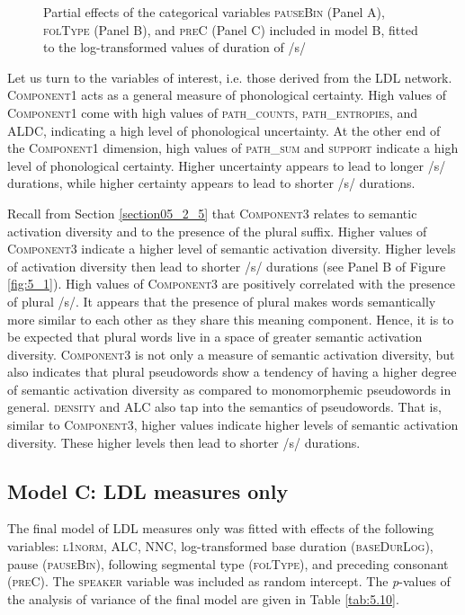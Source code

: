 \begin{figure}
    \centering
    
    \caption{Partial effects of the categorical variables \textsc{pauseBin} (Panel A), \textsc{folType} (Panel B), and \textsc{preC} (Panel C) included in model B, fitted to the log-transformed values of duration of /s/}
    \label{fig:5_2}
\end{figure}

Let us turn to the variables of interest, i.e. those derived from the LDL network. \textsc{Component1} acts as a general measure of phonological certainty. High values of \textsc{Component1} come with high values of \textsc{path\_counts}, \textsc{path\_entropies}, and \textsc{ALDC}, indicating a high level of phonological uncertainty. At the other end of the \textsc{Component1} dimension, high values of \textsc{path\_sum} and \textsc{support} indicate a high level of phonological certainty. Higher uncertainty appears to lead to longer /s/ durations, while higher certainty appears to lead to shorter /s/ durations.

Recall from Section \ref{section05_2_5} that \textsc{Component3} relates to semantic activation diversity and to the presence of the plural suffix. Higher values of \textsc{Component3} indicate a higher level of semantic activation diversity. Higher levels of activation diversity then lead to shorter /s/ durations (see Panel B of Figure \ref{fig:5_1}). High values of \textsc{Component3} are positively correlated with the presence of plural /s/. It appears that the presence of plural makes words semantically more similar to each other as they share this meaning component. Hence, it is to be expected that plural words live in a space of greater semantic activation diversity. \textsc{Component3} is not only a measure of semantic activation diversity, but also indicates that plural pseudowords show a tendency of having a higher degree of semantic activation diversity as compared to monomorphemic pseudowords in general. \textsc{density} and \textsc{ALC} also tap into the semantics of pseudowords. That is, similar to \textsc{Component3}, higher values indicate higher levels of semantic activation diversity. These higher levels then lead to shorter /s/ durations.

\subsection{Model C: LDL measures only}\label{section05_3_3}

The final model of LDL measures only was fitted with effects of the following variables: \textsc{l1norm}, \textsc{ALC}, \textsc{NNC}, log-transformed base duration (\textsc{baseDurLog}), pause (\textsc{pauseBin}), following segmental type (\textsc{folType}), and preceding consonant (\textsc{preC}). The \textsc{speaker} variable was included as random intercept. The \textit{p}-values of the analysis of variance of the final model are given in Table \ref{tab:5.10}.

